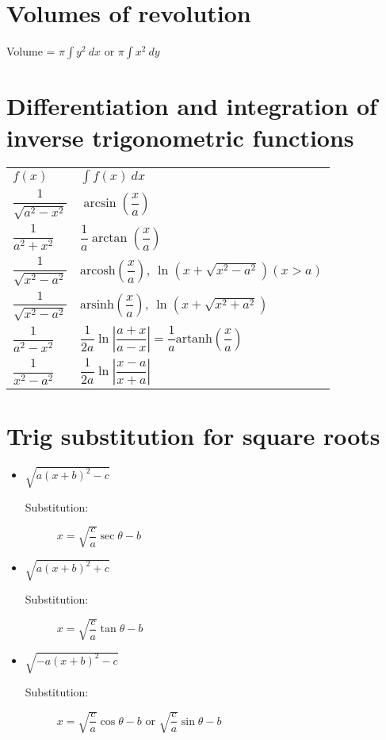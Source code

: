 \section{Volumes of revolution}
Volume = $\pi\int y^2 \: dx$ or $\pi\int x^2 \: dy$

\section{Differentiation and integration of inverse trigonometric functions }
\begin{tabular}{ll}
	$f(x)$ & $\int f(x) \: dx$\\
	$\dfrac{1}{\sqrt{a^2-x^2}}$ & $\arcsin(\dfrac{x}{a})$\\
	$\dfrac{1}{a^2+x^2}$ & $\dfrac{1}{a}\arctan(\dfrac{x}{a})$\\
	$\dfrac{1}{\sqrt{x^2-a^2}}$ & $\text{arcosh}(\dfrac{x}{a})$, $\ln(x+\sqrt{x^2-a^2}) (x>a)$\\
	$\dfrac{1}{\sqrt{x^2-a^2}}$ & $\text{arsinh}(\dfrac{x}{a})$, $\ln(x+\sqrt{x^2+a^2})$\\
	$\dfrac{1}{a^2-x^2}$ & $\dfrac{1}{2a}\ln |\dfrac{a+x}{a-x}| = \dfrac{1}{a}\text{artanh}(\dfrac{x}{a})$\\
	$\dfrac{1}{x^2-a^2}$ & $\dfrac{1}{2a}\ln |\dfrac{x-a}{x+a}|$\\
\end{tabular}

\section{Trig substitution for square roots}
\begin{itemize}
	\item $\sqrt{a(x+b)^2-c}$
	\begin{description}
		\item[Substitution:] $x = \sqrt{\dfrac{c}{a}}\sec\theta - b$
	\end{description}
	\item $\sqrt{a(x+b)^2+c}$
	\begin{description}
		\item[Substitution:] $x = \sqrt{\dfrac{c}{a}}\tan\theta - b$
	\end{description}
	\item $\sqrt{-a(x+b)^2-c}$
	\begin{description}
		\item[Substitution:] $x = \sqrt{\dfrac{c}{a}}\cos\theta - b$ or $\sqrt{\dfrac{c}{a}}\sin\theta - b$
	\end{description}
	
\end{itemize}

